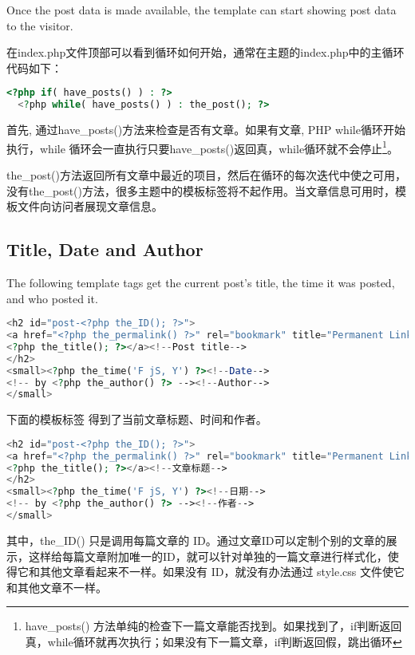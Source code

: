 Once the post data is made available, the template can start showing post data to the visitor.

在index.php文件顶部可以看到循环如何开始，通常在主题的index.php中的主循环代码如下：

\begin{lstlisting}[language=PHP]
<?php if( have_posts() ) : ?>
  <?php while( have_posts() ) : the_post(); ?>
\end{lstlisting}



首先, 通过have\_posts()方法来检查是否有文章。如果有文章, PHP while循环开始执行，while 循环会一直执行只要have\_posts()返回真，while循环就不会停止\footnote{have\_posts() 方法单纯的检查下一篇文章能否找到。如果找到了，if判断返回真，while循环就再次执行；如果没有下一篇文章，if判断返回假，跳出循环}。

the\_post()方法返回所有文章中最近的项目，然后在循环的每次迭代中使之可用，没有the\_post()方法，很多主题中的模板标签将不起作用。当文章信息可用时，模板文件向访问者展现文章信息。


\subsection{Title, Date and Author}

The following template tags get the current post's title, the time it was posted, and who posted it.

\begin{lstlisting}[language=PHP]
<h2 id="post-<?php the_ID(); ?>">
<a href="<?php the_permalink() ?>" rel="bookmark" title="Permanent Link to <?php the_title(); ?>">
<?php the_title(); ?></a><!--Post title-->
</h2>
<small><?php the_time('F jS, Y') ?><!--Date-->
<!-- by <?php the_author() ?> --><!--Author-->
</small>
\end{lstlisting}

下面的模板标签 得到了当前文章标题、时间和作者。

\begin{lstlisting}[language=PHP]
<h2 id="post-<?php the_ID(); ?>">
<a href="<?php the_permalink() ?>" rel="bookmark" title="Permanent Link to <?php the_title(); ?>">
<?php the_title(); ?></a><!--文章标题-->
</h2>
<small><?php the_time('F jS, Y') ?><!--日期-->
<!-- by <?php the_author() ?> --><!--作者-->
</small>
\end{lstlisting}

其中，the\_ID() 只是调用每篇文章的 ID。通过文章ID可以定制个别的文章的展示，这样给每篇文章附加唯一的ID，就可以针对单独的一篇文章进行样式化，使得它和其他文章看起来不一样。如果没有 ID，就没有办法通过 style.css 文件使它和其他文章不一样。

